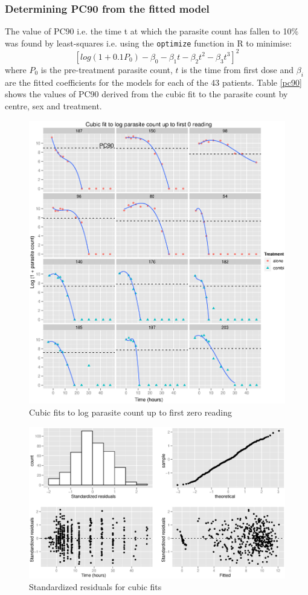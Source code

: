 \subsubsection*{Determining PC90 from the fitted model}
The value of PC90 i.e. the time t at which the parasite count has fallen to 10\% was found by least-squares i.e. using the \texttt{optimize} function in R to minimise:
$$[log(1+0.1P_0)-\beta_0-\beta_1t-\beta_2t^2-\beta_3t^3]^2$$
where $P_0$ is the pre-treatment parasite count, $t$ is the time from first dose and $\beta_i$ are the fitted coefficients for the models for each of the 43 patients. Table \ref{pc90} shows the values of PC90 derived from the cubic fit to the parasite count by centre, sex and treatment.
\begin{figure}[h]
\includegraphics[width=6.1in]{cubics.eps} 
\caption{Cubic fits to log parasite count up to first zero reading}\label{cubics}
\end{figure}
\begin{figure}[h]
\includegraphics[width=6.1in]{cubicsresid.eps} 
\caption{Standardized residuals for cubic fits}\label{cubicsresid}
\end{figure}
\clearpage
